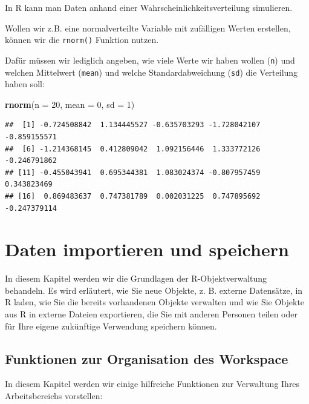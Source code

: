 \documentclass[
]{book}
\newenvironment{Shaded}{\begin{snugshade}}{\end{snugshade}}
\newcommand{\AttributeTok}[1]{\textcolor[rgb]{0.13,0.29,0.53}{#1}}
\newcommand{\DecValTok}[1]{\textcolor[rgb]{0.00,0.00,0.81}{#1}}
\newcommand{\FunctionTok}[1]{\textcolor[rgb]{0.13,0.29,0.53}{\textbf{#1}}}
\newcommand{\NormalTok}[1]{#1}
\begin{document}
In R kann man Daten anhand einer Wahrscheinlichkeitsverteilung simulieren.

Wollen wir z.B. eine normalverteilte Variable mit zufälligen Werten erstellen, können wir die \texttt{rnorm()} Funktion nutzen.

Dafür müssen wir lediglich angeben, wie viele Werte wir haben wollen (\texttt{n}) und welchen Mittelwert (\texttt{mean}) und welche Standardabweichung (\texttt{sd}) die Verteilung haben soll:

\begin{Shaded}
\begin{Highlighting}[]
\FunctionTok{rnorm}\NormalTok{(}\AttributeTok{n =} \DecValTok{20}\NormalTok{, }\AttributeTok{mean =} \DecValTok{0}\NormalTok{, }\AttributeTok{sd =} \DecValTok{1}\NormalTok{)}
\end{Highlighting}
\end{Shaded}

\begin{verbatim}
##  [1] -0.724508842  1.134445527 -0.635703293 -1.728042107 -0.859155571
##  [6] -1.214368145  0.412809042  1.092156446  1.333772126 -0.246791862
## [11] -0.455043941  0.695344381  1.083024374 -0.807957459  0.343823469
## [16]  0.869483637  0.747381789  0.002031225  0.747895692 -0.247379114
\end{verbatim}

\chapter{Daten importieren und speichern}\label{daten-importieren-und-speichern}

In diesem Kapitel werden wir die Grundlagen der R-Objektverwaltung behandeln. Es wird erläutert, wie Sie neue Objekte, z. B. externe Datensätze, in R laden, wie Sie die bereits vorhandenen Objekte verwalten und wie Sie Objekte aus R in externe Dateien exportieren, die Sie mit anderen Personen teilen oder für Ihre eigene zukünftige Verwendung speichern können.

\section{Funktionen zur Organisation des Workspace}\label{funktionen-zur-organisation-des-workspace}

In diesem Kapitel werden wir einige hilfreiche Funktionen zur Verwaltung Ihres Arbeitsbereichs vorstellen:
\end{document}
